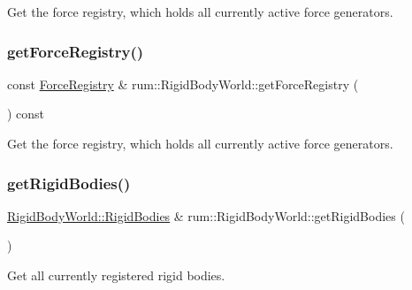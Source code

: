 Get the force registry, which holds all currently active force generators. \mbox{\label{classrum_1_1_rigid_body_world_a658404ecb3e0dcd9ef05ccc9f4a554d0}} 
\subsubsection{\texorpdfstring{get\+Force\+Registry()}{getForceRegistry()}\hspace{0.1cm}{\footnotesize\ttfamily [2/2]}}
{\footnotesize\ttfamily const \mbox{\hyperlink{classrum_1_1_force_registry}{Force\+Registry}} \& rum\+::\+Rigid\+Body\+World\+::get\+Force\+Registry (\begin{DoxyParamCaption}{ }\end{DoxyParamCaption}) const}

Get the force registry, which holds all currently active force generators. \mbox{\label{classrum_1_1_rigid_body_world_a7b2974169b0add2f3f113ab98d858a6a}} 
\subsubsection{\texorpdfstring{get\+Rigid\+Bodies()}{getRigidBodies()}\hspace{0.1cm}{\footnotesize\ttfamily [1/2]}}
{\footnotesize\ttfamily \mbox{\hyperlink{classrum_1_1_rigid_body_world_a9604007b7513d401a9a92ae5d9be9425}{Rigid\+Body\+World\+::\+Rigid\+Bodies}} \& rum\+::\+Rigid\+Body\+World\+::get\+Rigid\+Bodies (\begin{DoxyParamCaption}{ }\end{DoxyParamCaption})}

Get all currently registered rigid bodies. \mbox{\label{classrum_1_1_rigid_body_world_af3bb8e158d74093866c4a6ea614c4055}} 
